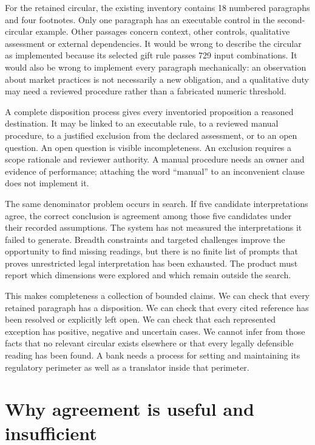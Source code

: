 For the retained circular, the existing inventory contains 18 numbered
paragraphs and four footnotes. Only one paragraph has an executable control in
the second-circular example. Other passages concern context, other controls,
qualitative assessment or external dependencies. It would be wrong to describe
the circular as implemented because its selected gift rule passes 729 input
combinations. It would also be wrong to implement every paragraph mechanically:
an observation about market practices is not necessarily a new obligation, and a
qualitative duty may need a reviewed procedure rather than a fabricated numeric
threshold.


A complete disposition process gives every inventoried proposition a reasoned
destination. It may be linked to an executable rule, to a reviewed manual
procedure, to a justified exclusion from the declared assessment, or to an open
question. An open question is visible incompleteness. An exclusion requires a
scope rationale and reviewer authority. A manual procedure needs an owner and
evidence of performance; attaching the word ``manual'' to an inconvenient clause
does not implement it.

The same denominator problem occurs in search. If five candidate interpretations
agree, the correct conclusion is agreement among those five candidates under
their recorded assumptions. The system has not measured the interpretations it
failed to generate. Breadth constraints and targeted challenges improve the
opportunity to find missing readings, but there is no finite list of prompts
that proves unrestricted legal interpretation has been exhausted. The product
must report which dimensions were explored and which remain outside the search.

This makes completeness a collection of bounded claims. We can check that every
retained paragraph has a disposition. We can check that every cited reference has
been resolved or explicitly left open. We can check that each represented
exception has positive, negative and uncertain cases. We cannot infer from those
facts that no relevant circular exists elsewhere or that every legally
defensible reading has been found. A bank needs a process for setting and
maintaining its regulatory perimeter as well as a translator inside that perimeter.

\section{Why agreement is useful and insufficient}
\label{merge:M01:04}

